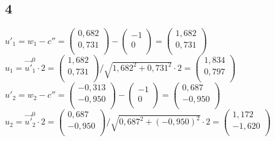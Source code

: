 \documentclass{../Vorlage/mat}
\begin{document}
\subsection*{4}
$u'_1 = w_1 - c'' =
\begin{pmatrix}
0,682\\
0,731\\
\end{pmatrix}
-
\begin{pmatrix}
-1\\
0\\
\end{pmatrix}
=
\begin{pmatrix}
1,682\\
0,731\\
\end{pmatrix}$\\

$u_1 = \vec{u'}^0_1 \cdot 2 = 
\begin{pmatrix}
1,682\\
0,731\\
\end{pmatrix} / \sqrt{1,682^2+0,731^2} \cdot 2 = 
\begin{pmatrix}
1,834\\
0,797\\
\end{pmatrix}
$\\


$u'_2 = w_2 - c'' =
\begin{pmatrix}
-0,313\\
-0,950\\
\end{pmatrix}
-
\begin{pmatrix}
-1\\
0\\
\end{pmatrix}
=
\begin{pmatrix}
0,687\\
-0,950\\
\end{pmatrix}$\\

$u_2 = \vec{u'}^0_2 \cdot 2 = 
\begin{pmatrix}
0,687\\
-0,950\\
\end{pmatrix} / \sqrt{0,687^2+(-0,950)^2} \cdot 2 = 
\begin{pmatrix}
1,172\\
-1,620\\
\end{pmatrix}
$
\end{document}

